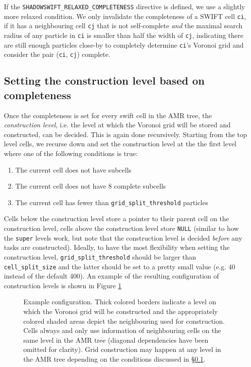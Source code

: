 If the \texttt{SHADOWSWIFT\_RELAXED\_COMPLETENESS} directive is defined, we use a slightly more relaxed condition. We only invalidate the completeness of a SWIFT cell \texttt{ci}, if it has a neighbouring cell \texttt{cj} that is not self-complete \emph{and} the maximal search radius of any particle in \texttt{ci} is smaller than half the width of \texttt{cj}, indicating there are still enough particles close-by to completely determine \texttt{ci}'s Voronoi grid and consider the pair (\texttt{ci}, \texttt{cj}) complete.


\subsection{Setting the construction level based on completeness} \label{sec:construction-level}

Once the completeness is set for every swift cell in the AMR tree, the \emph{construction level}, i.e. the level at which the Voronoi grid will be stored and constructed, can be decided. This is again done recursively. Starting from the top level cells, we recurse down and set the construction level at the the first level where one of the following conditions is true:
\begin{enumerate}
    \item The current cell does not have subcells
    \item The current cell does not have 8 complete subcells
    \item The current cell has fewer than \texttt{grid\_split\_threshold} particles
\end{enumerate} 
Cells below the construction level store a pointer to their parent cell on the construction level, cells above the construction level store \texttt{NULL} (similar to how the \texttt{super} levels work, but note that the construction level is decided \emph{before} any tasks are constructed).
Ideally, to have the most flexibility when setting the construction level, \texttt{grid\_split\_threshold} should be larger than \texttt{cell\_split\_size} and the latter should be set to a pretty small value (e.g. 40 instead of the default 400). An example of the resulting configuration of construction levels is shown in Figure \ref{fig:construction-level}

\begin{figure}
    \centering
    
    \caption{Example configuration.  Thick colored borders indicate a level on which the Voronoi grid will be constructed and the appropriately colored shaded areas depict the neighbouring used for construction. Cells always and only use information of neighbouring cells on the same level in the AMR tree (diagonal dependencies have been omitted for clarity). Grid construction may happen at any level in the AMR tree depending on the conditions discussed in \S\ref{sec:construction-level}.}
    \label{fig:construction-level}
\end{figure}

